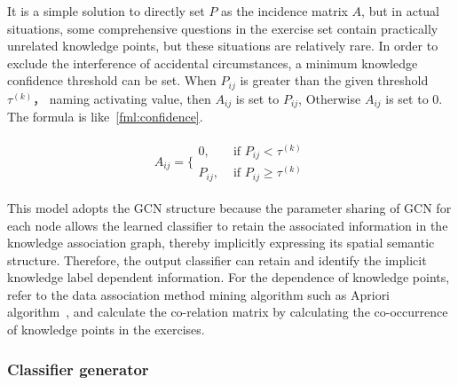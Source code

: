 It is a simple solution to directly set \(P\) as the incidence matrix \(A\), but in actual situations, some comprehensive questions in the exercise set contain practically unrelated knowledge points, but these situations are relatively rare. In order to exclude the interference of accidental circumstances, a minimum knowledge confidence threshold can be set. When \(P_{ij}\) is greater than the given threshold \(\tau^{(k)} \)， naming activating value, then \(A_{ij}\) is set to \(P_{ij}\), Otherwise \(A_{ij}\) is set to 0. The formula is like~\ref{fml:confidence}.

\begin{align}
	A_{ij}=\{\begin{array}{ll}
		0,      & \text{ if } P_{ij}<\tau^{(k)}      \\
		P_{ij}, & \text{ if } P_{ij} \geq \tau^{(k)}
	\end{array}\label{fml:confidence}
\end{align}



This model adopts the GCN structure because the parameter sharing of GCN for each node allows the learned classifier to retain the associated information in the knowledge association graph, thereby implicitly expressing its spatial semantic structure. Therefore, the output classifier can retain and identify the implicit knowledge label dependent information. For the dependence of knowledge points, refer to the data association method mining algorithm such as Apriori algorithm~\cite{panjaitan2019implementation}, and calculate the co-relation matrix by calculating the co-occurrence of knowledge points in the exercises.


\subsubsection{Classifier generator}


